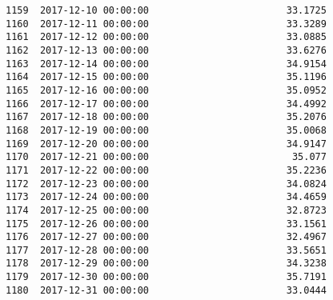 \documentclass[11pt]{article}
\begin{document}
\begin{tcolorbox}[breakable, size=fbox, boxrule=.5pt, pad at break*=1mm, opacityfill=0]
\begin{Verbatim}[commandchars=\\\{\}]
1159  2017-12-10 00:00:00                        33.1725
1160  2017-12-11 00:00:00                        33.3289
1161  2017-12-12 00:00:00                        33.0885
1162  2017-12-13 00:00:00                        33.6276
1163  2017-12-14 00:00:00                        34.9154
1164  2017-12-15 00:00:00                        35.1196
1165  2017-12-16 00:00:00                        35.0952
1166  2017-12-17 00:00:00                        34.4992
1167  2017-12-18 00:00:00                        35.2076
1168  2017-12-19 00:00:00                        35.0068
1169  2017-12-20 00:00:00                        34.9147
1170  2017-12-21 00:00:00                         35.077
1171  2017-12-22 00:00:00                        35.2236
1172  2017-12-23 00:00:00                        34.0824
1173  2017-12-24 00:00:00                        34.4659
1174  2017-12-25 00:00:00                        32.8723
1175  2017-12-26 00:00:00                        33.1561
1176  2017-12-27 00:00:00                        32.4967
1177  2017-12-28 00:00:00                        33.5651
1178  2017-12-29 00:00:00                        34.3238
1179  2017-12-30 00:00:00                        35.7191
1180  2017-12-31 00:00:00                        33.0444


\end{Verbatim}
\end{tcolorbox}
\end{document}

